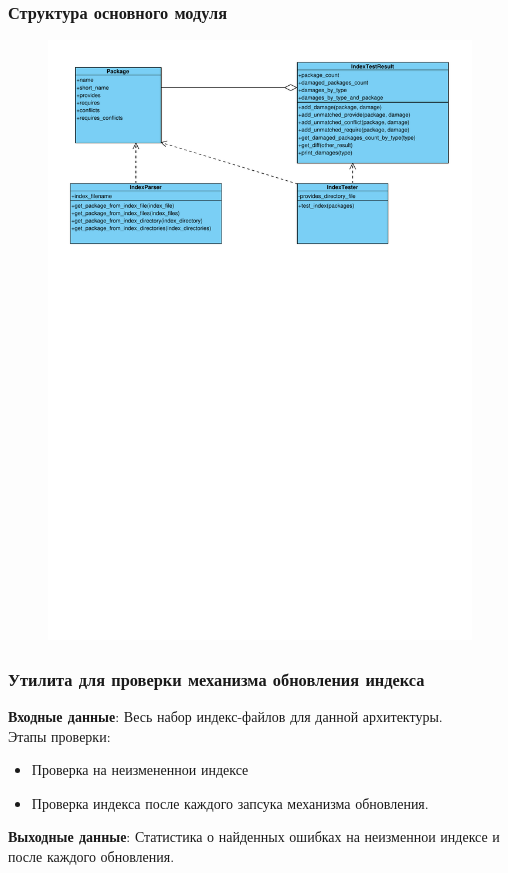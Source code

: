 \documentclass{beamer}
\begin{document}
\begin{frame}
\frametitle{Структура основного модуля}

\begin{figure}
\begin{center}
\vspace{0cm}
\hspace*{-1cm} \includegraphics[scale=0.6]{../resources/uml/ds_test_class_diagram.pdf}
\end{center}
\end{figure}

\end{frame}

\begin{frame}
\frametitle{Утилита для проверки механизма обновления индекса}
\textbf{Входные данные}: Весь набор индекс-файлов для данной архитектуры.\\
\vspace{0.5cm}
Этапы проверки:
\begin{itemize}
\item
Проверка на неизмененнои индексе
\item
Проверка индекса после каждого запсука механизма обновления.
\end{itemize}
\textbf{Выходные данные}: Статистика о найденных ошибках на неизменнои индексе
и после каждого обновления.
\end{frame}
\end{document}
